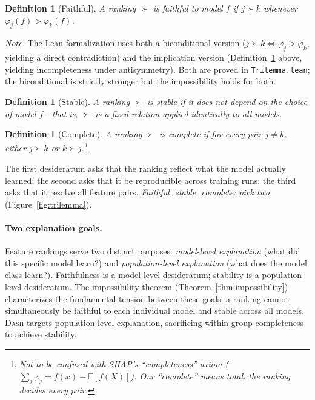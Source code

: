 \documentclass{article}
\newtheorem{definition}[theorem]{Definition}
\newcommand{\E}{\mathbb{E}}
\newcommand{\DASH}{\textsc{Dash}}
\begin{document}
\begin{definition}[Faithful]
\label{def:faithful}
A ranking $\succ$ is \emph{faithful} to model $f$ if $j \succ k$ whenever $\varphi_j(f) > \varphi_k(f)$.
\end{definition}

\noindent\emph{Note.} The Lean formalization uses both a biconditional version ($j \succ k \Leftrightarrow \varphi_j > \varphi_k$, yielding a direct contradiction) and the implication version (Definition~\ref{def:faithful} above, yielding incompleteness under antisymmetry). Both are proved in \texttt{Trilemma.lean}; the biconditional is strictly stronger but the impossibility holds for both.

\begin{definition}[Stable]
\label{def:stable}
A ranking $\succ$ is \emph{stable} if it does not depend on the choice of model $f$---that is, $\succ$ is a fixed relation applied identically to all models.
\end{definition}

\begin{definition}[Complete]
\label{def:complete}
A ranking $\succ$ is \emph{complete} if for every pair $j \neq k$, either $j \succ k$ or $k \succ j$.\footnote{Not to be confused with SHAP's ``completeness'' axiom ($\sum_j \varphi_j = f(x) - \E[f(X)]$). Our ``complete'' means \emph{total}: the ranking decides every pair.}
\end{definition}

The first desideratum asks that the ranking reflect what the model actually learned; the second asks that it be reproducible across training runs; the third asks that it resolve all feature pairs.
\emph{Faithful, stable, complete: pick two} (Figure~\ref{fig:trilemma}).

\paragraph{Two explanation goals.}
Feature rankings serve two distinct purposes: \emph{model-level explanation} (what did this specific model learn?) and \emph{population-level explanation} (what does the model class learn?).
Faithfulness is a model-level desideratum; stability is a population-level desideratum.
The impossibility theorem (Theorem~\ref{thm:impossibility}) characterizes the fundamental tension between these goals: a ranking cannot simultaneously be faithful to each individual model and stable across all models.
\DASH{} targets population-level explanation, sacrificing within-group completeness to achieve stability.
\end{document}
